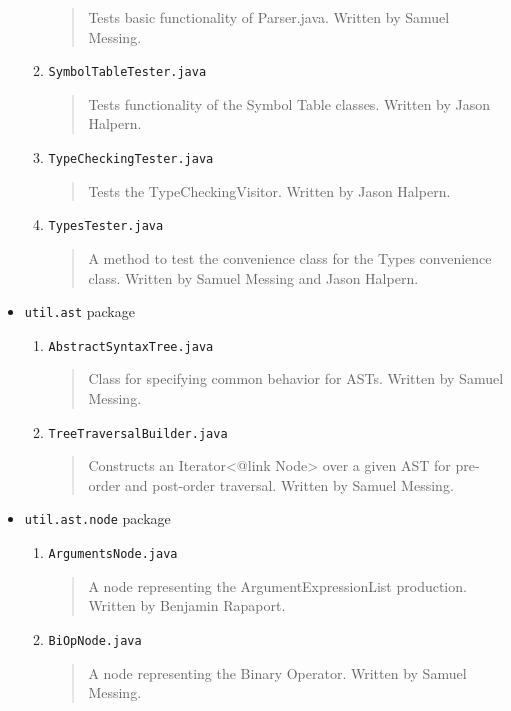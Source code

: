 \documentclass{report}
\begin{document}
\begin{itemize}
\begin{enumerate}
\begin{quotation}
\noindent Tests basic functionality of Parser.java. Written by Samuel Messing.
\end{quotation}
\item \texttt{SymbolTableTester.java}
\begin{quotation}
\noindent Tests functionality of the Symbol Table classes. Written by Jason Halpern. 
\end{quotation}
\item \texttt{TypeCheckingTester.java}
\begin{quotation}
\noindent Tests the TypeCheckingVisitor. Written by Jason Halpern. 
\end{quotation}
\item \texttt{TypesTester.java}
\begin{quotation}
\noindent A method to test the convenience class for the Types convenience class. Written by Samuel Messing and Jason Halpern. 
\end{quotation}
\end{enumerate} %
\item \texttt{util.ast} package
\begin{enumerate}
\item \texttt{AbstractSyntaxTree.java}
\begin{quotation}
\noindent Class for specifying common behavior for ASTs. Written by Samuel Messing. 
\end{quotation}
\item \texttt{TreeTraversalBuilder.java}
\begin{quotation}
\noindent Constructs an Iterator<{@link Node}> over a given AST for pre-order and post-order traversal. Written by Samuel Messing. 
\end{quotation}
\end{enumerate} %
\item \texttt{util.ast.node} package
\begin{enumerate}
\item \texttt{ArgumentsNode.java}
\begin{quotation}
\noindent A node representing the ArgumentExpressionList production. Written by Benjamin Rapaport.
\end{quotation}
\item \texttt{BiOpNode.java}
\begin{quotation}
\noindent  A node representing the Binary Operator. Written by Samuel Messing.
\end{quotation}

\end{enumerate}
\end{itemize}
\end{document}

